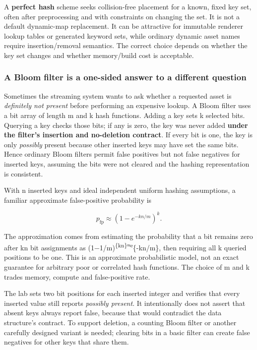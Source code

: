 A \textbf{perfect hash} scheme seeks collision-free placement for a known, fixed key set, often after preprocessing and with constraints on changing the set. It is not a default dynamic-map replacement. It can be attractive for immutable renderer lookup tables or generated keyword sets, while ordinary dynamic asset names require insertion/removal semantics. The correct choice depends on whether the key set changes and whether memory/build cost is acceptable.

\subsubsection{A Bloom filter is a one-sided answer to a different question}\label{a-bloom-filter-is-a-one-sided-answer-to-a-different-question}

Sometimes the streaming system wants to ask whether a requested asset is \emph{definitely not present} before performing an expensive lookup. A Bloom filter uses a bit array of length m and k hash functions. Adding a key sets k selected bits. Querying a key checks those bits; if any is zero, the key was never added \textbf{under the filter's insertion and no-deletion contract}. If every bit is one, the key is only \emph{possibly} present because other inserted keys may have set the same bits. Hence ordinary Bloom filters permit false positives but not false negatives for inserted keys, assuming the bits were not cleared and the hashing representation is consistent.

With n inserted keys and ideal independent uniform hashing assumptions, a familiar approximate false-positive probability is

\[
p_{\mathrm{fp}}\approx\left(1-e^{-kn/m}\right)^k.
\]

The approximation comes from estimating the probability that a bit remains zero after kn bit assignments as (1−1/m)\textsuperscript{\{kn\}≈e}\{-kn/m\}, then requiring all k queried positions to be one. This is an approximate probabilistic model, not an exact guarantee for arbitrary poor or correlated hash functions. The choice of m and k trades memory, compute and false-positive rate.

The lab sets two bit positions for each inserted integer and verifies that every inserted value still reports \emph{possibly present}. It intentionally does not assert that absent keys always report false, because that would contradict the data structure's contract. To support deletion, a counting Bloom filter or another carefully designed variant is needed; clearing bits in a basic filter can create false negatives for other keys that share them.

